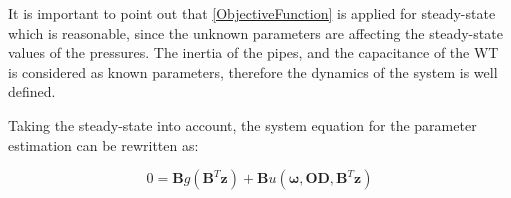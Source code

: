 It is important to point out that \eqref{ObjectiveFunction} is applied for steady-state which is reasonable, since the unknown parameters are affecting the steady-state values of the pressures. The inertia of the pipes, and the capacitance of the WT is considered as known parameters, therefore the dynamics of the system is well defined. 

Taking the steady-state into account, the system equation for the parameter estimation can be rewritten as: 

\begin{equation}
 0 = \pmb{B} g(\pmb{B}^T \pmb{z})+ \pmb{B} u(\pmb{\omega},\pmb{OD}, \pmb{B}^T \pmb{z})
 \label{InputOutputmodel_steadystate}
\end{equation}



%
 
% 

%


